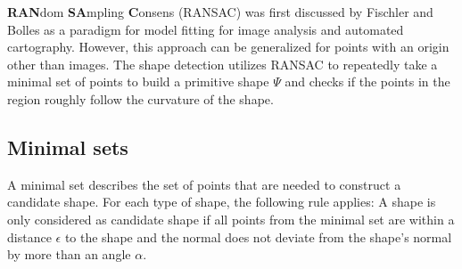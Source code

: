 \textbf{RAN}dom \textbf{SA}mpling \textbf{C}onsens (RANSAC) was first discussed by Fischler and Bolles\cite{fischler1981random} as a paradigm for model fitting for image analysis and automated cartography. However, this approach can be generalized for points with an origin other than images. The shape detection utilizes RANSAC to repeatedly take a minimal set of points to build a primitive shape $\Psi$ and checks if the points in the region roughly follow the curvature of the shape. 

\subsection{Minimal sets}

A minimal set describes the set of points that are needed to construct a candidate shape. 
For each type of shape, the following rule applies: A shape is only considered as candidate shape if all points from the minimal set are within a distance $\epsilon$ to the shape and the normal does not deviate from the shape's normal by more than an angle $\alpha$. 

